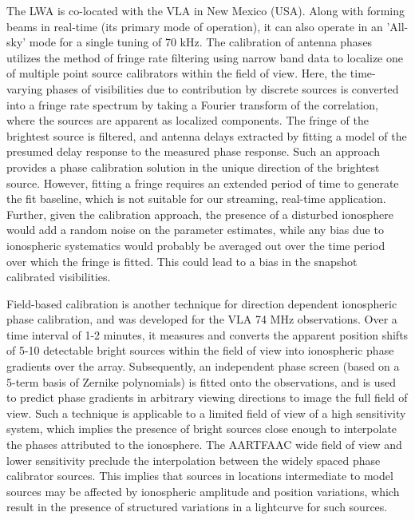 \documentclass{aa}
\begin{document}
The  LWA  \citep{ellingsonLWA1}  is  co-located  with  the  VLA  in  New  Mexico
(USA). Along with forming beams in real-time (its primary mode of operation), it
can  also operate  in an  'All-sky' mode  for a  single tuning  of 70  kHz.  The
calibration of antenna phases utilizes the method of fringe rate filtering using
narrow band data to localize one of multiple point source calibrators within the
field of view. Here, the time-varying phases of visibilities due to contribution
by discrete sources is converted into a fringe rate spectrum by taking a Fourier
transform  of the  correlation,  where  the sources  are  apparent as  localized
components. The fringe  of the brightest source is  filtered, and antenna delays
extracted by  fitting a  model of  the presumed delay  response to  the measured
phase response.  Such  an approach provides a phase  calibration solution in the
unique direction of the brightest source.  However, fitting a fringe requires an
extended period of time to generate  the fit baseline, which is not suitable for
our streaming, real-time application.   Further, given the calibration approach,
the presence of a disturbed ionosphere would add a random noise on the parameter
estimates,  while any  bias due  to  ionospheric systematics  would probably  be
averaged out  over the time period over  which the fringe is  fitted. This could
lead to a bias in the snapshot calibrated visibilities.

Field-based  calibration  \citep{cottona2004beyond}  is  another  technique  for
direction dependent ionospheric phase calibration, and was developed for the VLA
74  MHz observations.   Over a  time interval  of 1-2  minutes, it  measures and
converts the apparent  position shifts of 5-10 detectable  bright sources within
the field of view into ionospheric phase gradients over the array. Subsequently,
an independent phase screen (based on  a 5-term basis of Zernike polynomials) is
fitted  onto  the  observations, and  is  used  to  predict phase  gradients  in
arbitrary viewing directions to image the  full field of view.  Such a technique
is applicable  to a limited  field of view  of a high sensitivity  system, which
implies the  presence of bright sources  close enough to  interpolate the phases
attributed  to  the  ionosphere. The  AARTFAAC  wide  field  of view  and  lower
sensitivity  preclude   the  interpolation  between  the   widely  spaced  phase
calibrator  sources.  This  implies that  sources in  locations  intermediate to
model sources may be affected  by ionospheric amplitude and position variations,
which result in  the presence of structured variations in  a lightcurve for such
sources. %
\end{document}
